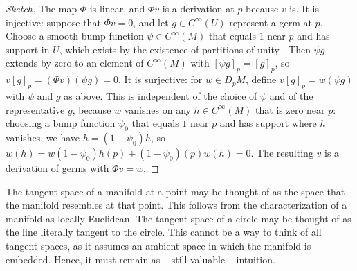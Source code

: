 \documentclass[a4paper,12pt]{article}
\begin{document}
\begin{proof}[Sketch]
    The map $\Phi$ is linear, and $\Phi v$ is a derivation at $p$ because $v$ is.
    It is injective: suppose that $\Phi v = 0$, and let $g \in C^\infty(U)$ represent a germ at $p$.
    Choose a smooth bump function $\psi \in C^\infty(M)$ that equals $1$ near $p$ and has support in $U$, which exists by the existence of partitions of unity \cite[Thm.~2.23]{Lee2012}.
    Then $\psi g$ extends by zero to an element of $C^\infty(M)$ with $[\psi g]_p = [g]_p$, so $v[g]_p = (\Phi v)(\psi g) = 0$.
    It is surjective: for $w \in D_p M$, define $v[g]_p = w(\psi g)$ with $\psi$ and $g$ as above.
    This is independent of the choice of $\psi$ and of the representative $g$, because $w$ vanishes on any $h \in C^\infty(M)$ that is zero near $p$: choosing a bump function $\psi_0$ that equals $1$ near $p$ and has support where $h$ vanishes, we have $h = (1 - \psi_0)h$, so $w(h) = w(1 - \psi_0)h(p) + (1 - \psi_0)(p)w(h) = 0$.
    The resulting $v$ is a derivation of germs with $\Phi v = w$.
\end{proof}
The tangent space of a manifold at a point may be thought of as the space that the manifold resembles at that point.
This follows from the characterization of a manifold as locally Euclidean.
The tangent space of a circle may be thought of as the line literally tangent to the circle.
This cannot be a way to think of all tangent spaces, as it assumes an ambient space in which the manifold is embedded.
Hence, it must remain as -- still valuable -- intuition.
\end{document}
